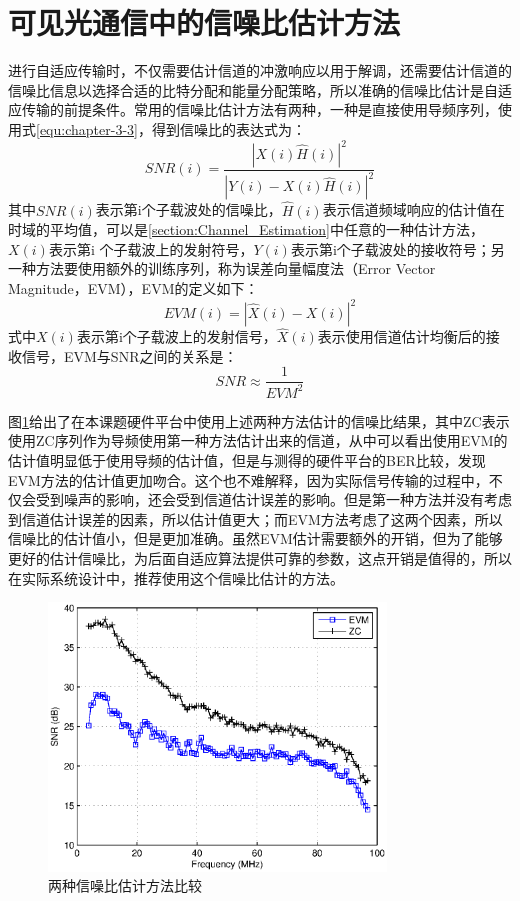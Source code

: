 \section{可见光通信中的信噪比估计方法}
进行自适应传输时，不仅需要估计信道的冲激响应以用于解调，还需要估计信道的信噪比信息以选择合适的比特分配和能量分配策略，所以准确的信噪比估计是自适应传输的前提条件。常用的信噪比估计方法有两种，一种是直接使用导频序列，使用式\ref{equ:chapter-3-3}，得到信噪比的表达式为：
\begin{equation}
SNR(i) = \frac{|X(i) \hat{H}(i)|^2}{|Y(i)-X(i) \hat{H}(i)|^2}
\end{equation}
其中$SNR(i)$表示第i个子载波处的信噪比，$\hat{H}(i)$表示信道频域响应的估计值在时域的平均值，可以是\ref{section:Channel_Estimation}中任意的一种估计方法，$X(i)$表示第i 个子载波上的发射符号，$Y(i)$表示第i个子载波处的接收符号；另一种方法要使用额外的训练序列，称为误差向量幅度法（Error Vector Magnitude，EVM），EVM的定义如下：
\begin{equation}
EVM(i) = |\hat{X}(i)-X(i)|^2
\end{equation}
式中$X(i)$表示第i个子载波上的发射信号，$\hat{X}(i)$表示使用信道估计均衡后的接收信号，EVM与SNR之间的关系是\cite{shafik2006extended}：
\begin{equation}
SNR \approx \frac{1}{EVM^2}
\end{equation}

图\ref{fig:SNR_ZC_EVM}给出了在本课题硬件平台中使用上述两种方法估计的信噪比结果，其中ZC表示使用ZC序列作为导频使用第一种方法估计出来的信道，从中可以看出使用EVM的估计值明显低于使用导频的估计值，但是与测得的硬件平台的BER比较，发现EVM方法的估计值更加吻合。这个也不难解释，因为实际信号传输的过程中，不仅会受到噪声的影响，还会受到信道估计误差的影响。但是第一种方法并没有考虑到信道估计误差的因素，所以估计值更大；而EVM方法考虑了这两个因素，所以信噪比的估计值小，但是更加准确。虽然EVM估计需要额外的开销，但为了能够更好的估计信噪比，为后面自适应算法提供可靠的参数，这点开销是值得的，所以在实际系统设计中，推荐使用这个信噪比估计的方法。
\begin{figure}[htbp]
\centering
\includegraphics[width=0.8\textwidth]{figures/chapter-3/SNR_ZC_EVM.eps}
\caption{两种信噪比估计方法比较}
\label{fig:SNR_ZC_EVM}
\end{figure}
